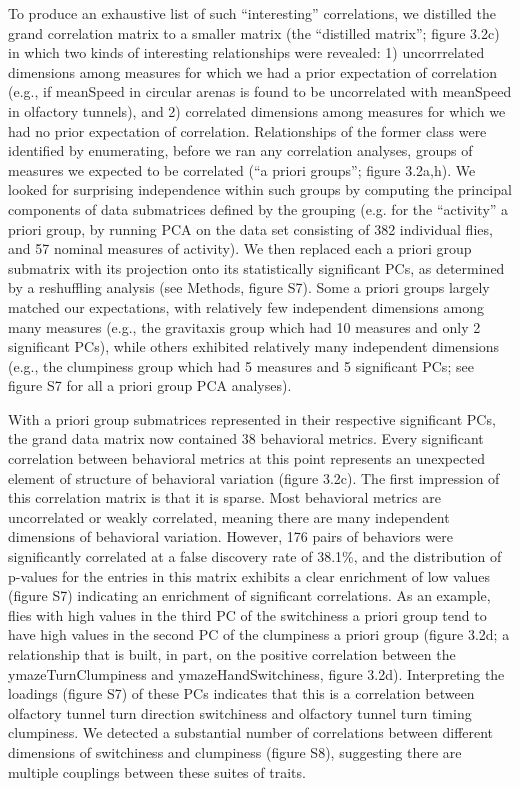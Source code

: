 \documentclass[12pt,letterpaper]{article}
\begin{document}
To produce an exhaustive list of such “interesting” correlations, we distilled the grand correlation matrix to a smaller matrix (the “distilled matrix”; figure 3.2c) in which two kinds of interesting relationships were revealed: 1) uncorrrelated dimensions among measures for which we had a prior expectation of correlation (e.g., if meanSpeed in circular arenas is found to be uncorrelated with meanSpeed in olfactory tunnels), and 2) correlated dimensions among measures for which we had no prior expectation of correlation. Relationships of the former class were identified by enumerating, before we ran any correlation analyses, groups of measures we expected to be correlated (“a priori groups”; figure 3.2a,h). We looked for surprising independence within such groups by computing the principal components of data submatrices defined by the grouping (e.g. for the “activity” a priori group, by running PCA on the data set consisting of 382 individual flies, and 57 nominal measures of activity). We then replaced each a priori group submatrix with its projection onto its statistically significant PCs, as determined by a reshuffling analysis (see Methods, figure S7). Some a priori groups largely matched our expectations, with relatively few independent dimensions among many measures (e.g., the gravitaxis group which had 10 measures and only 2 significant PCs), while others exhibited relatively many independent dimensions (e.g., the clumpiness group which had 5 measures and 5 significant PCs; see figure S7 for all a priori group PCA analyses). 

With a priori group submatrices represented in their respective significant PCs, the grand data matrix now contained 38 behavioral metrics. Every significant correlation between behavioral metrics at this point represents an unexpected element of structure of behavioral variation (figure 3.2c). The first impression of this correlation matrix is that it is sparse. Most behavioral metrics are uncorrelated or weakly correlated, meaning there are many independent dimensions of behavioral variation. However, 176 pairs of behaviors were significantly correlated at a false discovery rate of 38.1\%, and the distribution of p-values for the entries in this matrix exhibits a clear enrichment of low values (figure S7) indicating an enrichment of significant correlations. As an example, flies with high values in the third PC of the switchiness a priori group tend to have high values in the second PC of the clumpiness a priori group (figure 3.2d; a relationship that is built, in part, on the positive correlation between the ymazeTurnClumpiness and ymazeHandSwitchiness, figure 3.2d). Interpreting the loadings (figure S7) of these PCs indicates that this is a correlation between olfactory tunnel turn direction switchiness and olfactory tunnel turn timing clumpiness. We detected a substantial number of correlations between different dimensions of switchiness and clumpiness (figure S8), suggesting there are multiple couplings between these suites of traits. 
\end{document}
